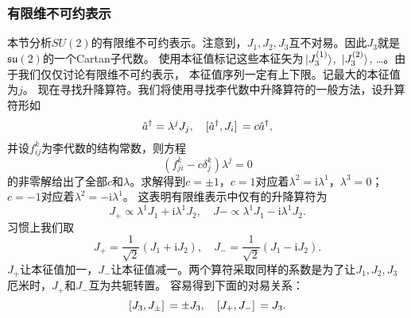 \documentclass[hyperref, UTF8, a4paper]{ctexart}
\newcommand*{\ii}{\mathrm{i}}
\begin{document}
\subsubsection{有限维不可约表示}

本节分析$SU(2)$的有限维不可约表示。注意到，$J_1, J_2, J_3$互不对易。因此$J_3$就是$\mathfrak{su}(2)$的一个Cartan子代数。
使用本征值标记这些本征矢为$\ket*{J_3^{(1)}}$, $\ket*{J_3^{(2)}}$, \dots。由于我们仅仅讨论有限维不可约表示，
本征值序列一定有上下限。记最大的本征值为$j$。
现在寻找升降算符。我们将使用寻找李代数中升降算符的一般方法，设升算符形如
\[
    \hat{a}^\dagger = \lambda^j J_j, \quad \comm*{\hat{a}^\dagger}{J_i} = c \hat{a}^\dagger,
\]
并设$f_{ij}^k$为李代数的结构常数，则方程
\[
    (f_{ji}^k - c \delta_j^k) \lambda^j = 0
\]
的非零解给出了全部$c$和$\lambda$。求解得到$c = \pm 1$，$c=1$对应着$\lambda^2 = \ii \lambda^1$，$\lambda^3 = 0$；$c=-1$对应着$\lambda^2 = - \ii \lambda^1$。
这表明有限维表示中仅有的升降算符为
\[
    J_+ \propto \lambda^1 J_1 + \ii \lambda^1 J_2, \quad J- \propto \lambda^1 J_1 - \ii \lambda^1 J_2. 
\]
习惯上我们取
\begin{equation}
    J_+ = \frac{1}{\sqrt{2}} (J_1 + \ii J_2), \quad J_- = \frac{1}{\sqrt{2}} (J_1 - \ii J_2).
\end{equation}
$J_+$让本征值加一，$J_-$让本征值减一。两个算符采取同样的系数是为了让$J_1,J_2,J_3$厄米时，$J_+$和$J_-$互为共轭转置。
容易得到下面的对易关系：
\begin{equation}
    \comm*{J_3}{J_{\pm}} = \pm J_3, \quad \comm*{J_+}{J_-} = J_3.
\end{equation}
\end{document}
